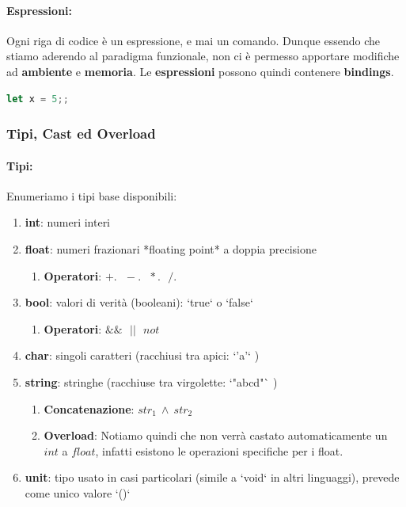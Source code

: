 \documentclass{article}
\begin{document}
\paragraph{Espressioni:} Ogni riga di codice è un espressione, e mai un comando. Dunque essendo che stiamo aderendo al paradigma funzionale, non ci è permesso apportare modifiche ad \textbf{ambiente} e \textbf{memoria}.
Le \textbf{espressioni} possono quindi contenere \textbf{bindings}.

\vspace*{10px}

\begin{lstlisting}[language=JavaScript]
    let x = 5;;
\end{lstlisting}

\vspace*{-15px}

\subsubsection{Tipi, Cast ed Overload}

\paragraph{Tipi:} Enumeriamo i tipi base disponibili:
\begin{enumerate}
    \item \textbf{int}: numeri interi
    \item \textbf{float}: numeri frazionari *floating point* a doppia precisione
    \begin{enumerate}
        \item \textbf{Operatori}: $+. \:\:\: -. \:\:\: *. \:\:\: /. $
    \end{enumerate}
    \item \textbf{bool}: valori di verità (booleani): `true` o `false`
    \begin{enumerate}
        \item \textbf{Operatori}: $  \& \& \:\:\: || \:\:\: not $
    \end{enumerate}
    \item \textbf{char}: singoli caratteri (racchiusi tra apici: `'a'` )
    \item \textbf{string}: stringhe (racchiuse tra virgolette: `"abcd"` )
    \begin{enumerate}
        \item \textbf{Concatenazione}: $str_{1}\:\wedge\:str_{2}$
        \item \textbf{Overload}: Notiamo quindi che non verrà castato automaticamente un $int$ a $float$, infatti esistono le operazioni specifiche per i float.
    \end{enumerate}
    \item \textbf{unit}: tipo usato in casi particolari (simile a `void` in altri linguaggi), prevede come unico valore `()`
\end{enumerate}
\end{document}
